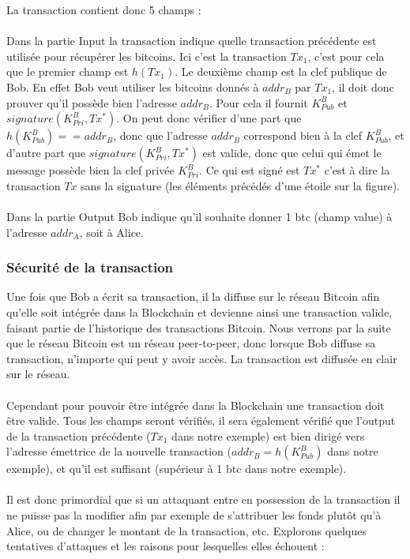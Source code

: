 \documentclass[11pt,a4paper]{article}
\begin{document}
\noindent La transaction contient donc 5 champs :\\\\
Dans la partie Input la transaction indique quelle transaction précédente est utilisée pour récupérer les bitcoins. Ici c'est la transaction $Tx_1$, c'est pour cela que le premier champ est $h(Tx_1)$. Le deuxième champ est la clef publique de Bob. En effet Bob veut utiliser les bitcoins donnés à $addr_B$ par $Tx_1$, il doit donc prouver qu'il possède bien l'adresse $addr_B$. Pour cela il fournit 
$K_{Pub}^{B}$ et $signature(K_{Pri}^{B}, Tx^*)$. On peut donc vérifier d'une part que $h(K_{Pub}^{B}) == addr_B$, donc que l'adresse $addr_B$ correspond bien à la clef $K_{Pub}^{B}$, et d'autre part que $signature(K_{Pri}^{B}, Tx^*)$ est valide, donc que celui qui émet le message possède bien la clef privée $K_{Pri}^{B}$. Ce qui est signé est $Tx^*$ c'est à dire la transaction $Tx$ sans la signature (les éléments précédés d'une étoile sur la figure).\\\\
Dans la partie Output Bob indique qu'il souhaite donner 1 btc (champ value) à l'adresse $addr_A$, soit à Alice.

\subsubsection{Sécurité de la transaction}

Une fois que Bob a écrit sa transaction, il la diffuse sur le réseau Bitcoin afin qu'elle soit intégrée dans la Blockchain et devienne ainsi une transaction valide, faisant partie de l'historique des transactions Bitcoin. Nous verrons par la suite que le réseau Bitcoin est un réseau peer-to-peer, donc lorsque Bob diffuse sa transaction, n'importe qui peut y avoir accès. La transaction est diffusée en clair sur le réseau.\\\\
Cependant pour pouvoir être intégrée dans la Blockchain une transaction doit être valide. Tous les champs seront vérifiés, il sera également vérifié que l'output de la transaction précédente ($Tx_1$ dans notre exemple) est bien dirigé vers l'adresse émettrice de la nouvelle transaction 
($addr_B=h(K_{Pub}^{B})$ dans notre exemple), et qu'il est suffisant (supérieur à 1 btc dans notre exemple).
\\\\
Il est donc primordial que si un attaquant entre en possession de la transaction il ne puisse pas la modifier afin par exemple de s'attribuer les fonds plutôt qu'à Alice, ou de changer le montant de la transaction, etc. Explorons quelques tentatives d'attaques et les raisons pour lesquelles elles échouent :
\end{document}
